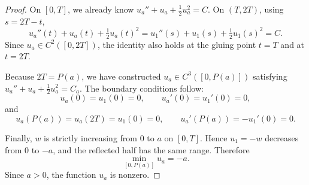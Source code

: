\begin{proof}
On $[0,T]$, we already know $u_a'' + u_a + \frac{1}{2}u_a^2 = C$. On $(T,2T)$, using $s = 2T - t$,
\[
u_a''(t) + u_a(t) + \tfrac{1}{2}u_a(t)^2 = u_1''(s) + u_1(s) + \tfrac{1}{2}u_1(s)^2 = C.
\]
Since $u_a \in C^2([0,2T])$, the identity also holds at the gluing point $t = T$ and at $t = 2T$.

Because $2T = P(a)$, we have constructed $u_a \in C^3([0,P(a)])$ satisfying $u_a'' + u_a + \frac{1}{2}u_a^2 = C_a$. The boundary conditions follow:
\[
u_a(0) = u_1(0) = 0, \qquad u_a'(0) = u_1'(0) = 0,
\]
and
\[
u_a(P(a)) = u_a(2T) = u_1(0) = 0, \qquad u_a'(P(a)) = -u_1'(0) = 0.
\]

Finally, $w$ is strictly increasing from $0$ to $a$ on $[0,T]$. Hence $u_1 = -w$ decreases from $0$ to $-a$, and the reflected half has the same range. Therefore
\[
\min_{[0,P(a)]} u_a = -a.
\]
Since $a > 0$, the function $u_a$ is nonzero.
\end{proof}
